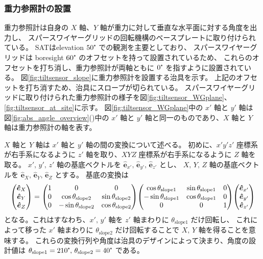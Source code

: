 \documentclass[../../main.tex]{subfiles}
\begin{document}
\subsubsection{重力参照計の設置}
\label{subsubsec:wg_tiltsensor_slope}
重力参照計は自身の $X$ 軸、$Y$ 軸が重力に対して垂直な水平面に対する角度を出力し、
スパースワイヤーグリッドの回転機構のベースプレートに取り付けられている。
SATはelevation $50\tcdegree$ での観測を主要としており、
スパースワイヤーグリッドは boresight $60\tcdegree$ のオフセットを持って設置されているため、
これらのオフセットを打ち消し、重力参照計が両軸ともに $0\tcdegree$ を指すように設置されている。
図\ref{fig:tiltsensor_slope}に重力参照計を設置する治具を示す。
上記のオフセットを打ち消すため、治具にスロープが切られている。
スパースワイヤーグリッドに取り付けられた重力参照計の様子を図\ref{fig:tiltsensor_WGplane}、\ref{fig:tiltsensor_at_site}に示す。
図\ref{fig:tiltsensor_WGplane}中の $x'$ 軸と $y'$ 軸は
図\ref{fig:abs_angle_overview}()中の $x'$ 軸と $y'$ 軸と同一のものであり、$X$ 軸と $Y$ 軸は重力参照計の軸を表す。

$X$ 軸と $Y$ 軸は $x'$ 軸と $y'$ 軸の間の変換について述べる。
初めに、$x'y'z'$ 座標系が右手系になるように $z'$ 軸を取り、$XYZ$ 座標系が右手系になるように $Z$ 軸を取る。
$x',\,y',\,z'$ 軸の基底ベクトルを $\bm{\hat{e}}_{x'},\,\bm{\hat{e}}_{y'},\,\bm{\hat{e}}_{z'}$ とし、
$X,\,Y,\,Z$ 軸の基底ベクトルを $\bm{\hat{e}}_{X},\,\bm{\hat{e}}_{Y},\,\bm{\hat{e}}_{Z}$ とする。
基底の変換は
\begin{equation}
    \label{eq:wg_tiltsensor_slope_trans}
    \mqty(\bm{\hat{e}}_{X} \\
          \bm{\hat{e}}_{Y} \\
          \bm{\hat{e}}_{Z}
          ) 
    = \mqty(1 & 0 & 0 \\
            0 & \cos\theta_{\mathrm{slope}2} & \sin\theta_{\mathrm{slope}2} \\
            0 & -\sin\theta_{\mathrm{slope}2} & \cos\theta_{\mathrm{slope}2}
            )
      \mqty(\cos\theta_{\mathrm{slope}1} & \sin\theta_{\mathrm{slope}1} & 0 \\
            -\sin\theta_{\mathrm{slope}1} & \cos\theta_{\mathrm{slope}1} & 0 \\
            0 & 0 & 1
            )
      \mqty(\bm{\hat{e}}_{x'} \\
            \bm{\hat{e}}_{y'} \\
            \bm{\hat{e}}_{z'}
            )
\end{equation}
となる。これはすなわち、$x',\,y'$ 軸を $z'$ 軸まわりに $\theta_{\mathrm{slope}1}$ だけ回転し、
これによって移った $x'$ 軸まわりに $\theta_{\mathrm{slope}2}$ だけ回転することで $X,\,Y$ 軸を得ることを意味する。
これらの変換行列や角度は治具のデザインによって決まり、角度の設計値は $\theta_{\mathrm{slope}1} = 210\tcdegree,\,\theta_{\mathrm{slope}2} = 40\tcdegree$ である。
\end{document}
